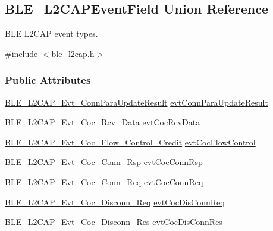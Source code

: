 \hypertarget{union_b_l_e___l2_c_a_p_event_field}{}\subsection{B\+L\+E\+\_\+\+L2\+C\+A\+P\+Event\+Field Union Reference}
\label{union_b_l_e___l2_c_a_p_event_field}


B\+LE L2\+C\+AP event types.  




{\ttfamily \#include $<$ble\+\_\+l2cap.\+h$>$}

\subsubsection*{Public Attributes}
\begin{DoxyCompactItemize}
\item 
\hyperlink{struct_b_l_e___l2_c_a_p___evt___conn_para_update_result}{B\+L\+E\+\_\+\+L2\+C\+A\+P\+\_\+\+Evt\+\_\+\+Conn\+Para\+Update\+Result} \hyperlink{union_b_l_e___l2_c_a_p_event_field_a33b165aad5e120d3f9dc00a7bf76ce25}{evt\+Conn\+Para\+Update\+Result}
\item 
\hyperlink{struct_b_l_e___l2_c_a_p___evt___coc___rcv___data}{B\+L\+E\+\_\+\+L2\+C\+A\+P\+\_\+\+Evt\+\_\+\+Coc\+\_\+\+Rcv\+\_\+\+Data} \hyperlink{union_b_l_e___l2_c_a_p_event_field_afee9746589a046d8be6f8af5c3b6dd8a}{evt\+Coc\+Rcv\+Data}
\item 
\hyperlink{struct_b_l_e___l2_c_a_p___evt___coc___flow___control___credit}{B\+L\+E\+\_\+\+L2\+C\+A\+P\+\_\+\+Evt\+\_\+\+Coc\+\_\+\+Flow\+\_\+\+Control\+\_\+\+Credit} \hyperlink{union_b_l_e___l2_c_a_p_event_field_a5817e010bdc045f56e6ea15bbde61f80}{evt\+Coc\+Flow\+Control}
\item 
\hyperlink{struct_b_l_e___l2_c_a_p___evt___coc___conn___rsp}{B\+L\+E\+\_\+\+L2\+C\+A\+P\+\_\+\+Evt\+\_\+\+Coc\+\_\+\+Conn\+\_\+\+Rsp} \hyperlink{union_b_l_e___l2_c_a_p_event_field_aad80a0e724574e1687d41d12dde31772}{evt\+Coc\+Conn\+Rsp}
\item 
\hyperlink{struct_b_l_e___l2_c_a_p___evt___coc___conn___req}{B\+L\+E\+\_\+\+L2\+C\+A\+P\+\_\+\+Evt\+\_\+\+Coc\+\_\+\+Conn\+\_\+\+Req} \hyperlink{union_b_l_e___l2_c_a_p_event_field_a4c20688a5289e8efac8e550f16f4a431}{evt\+Coc\+Conn\+Req}
\item 
\hyperlink{struct_b_l_e___l2_c_a_p___evt___coc___disconn___req}{B\+L\+E\+\_\+\+L2\+C\+A\+P\+\_\+\+Evt\+\_\+\+Coc\+\_\+\+Disconn\+\_\+\+Req} \hyperlink{union_b_l_e___l2_c_a_p_event_field_a738e1dea92695d05b54eb4e4a68ec130}{evt\+Coc\+Dis\+Conn\+Req}
\item 
\hyperlink{struct_b_l_e___l2_c_a_p___evt___coc___disconn___res}{B\+L\+E\+\_\+\+L2\+C\+A\+P\+\_\+\+Evt\+\_\+\+Coc\+\_\+\+Disconn\+\_\+\+Res} \hyperlink{union_b_l_e___l2_c_a_p_event_field_afa4b83b3870f8397c161a433b90388e1}{evt\+Coc\+Dis\+Conn\+Res}
\end{DoxyCompactItemize}


